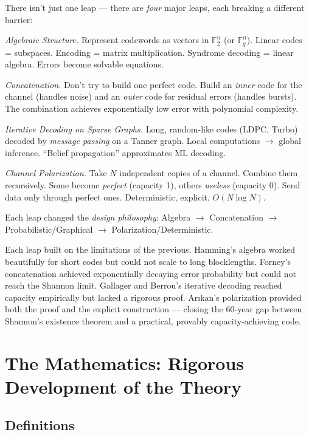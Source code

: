 There isn't just one leap — there are \emph{four} major leaps, each breaking a different barrier:

\emph{Algebraic Structure.} Represent codewords as vectors in $\mathbb{F}_2^n$ (or $\mathbb{F}_q^n$). Linear codes = subspaces. Encoding = matrix multiplication. Syndrome decoding = linear algebra. Errors become solvable equations.

\emph{Concatenation.} Don't try to build one perfect code. Build an \emph{inner} code for the channel (handles noise) and an \emph{outer} code for residual errors (handles bursts). The combination achieves exponentially low error with polynomial complexity.

\emph{Iterative Decoding on Sparse Graphs.} Long, random-like codes (LDPC, Turbo) decoded by \emph{message passing} on a Tanner graph. Local computations $\to$ global inference. ``Belief propagation'' approximates ML decoding.

\emph{Channel Polarization.} Take $N$ independent copies of a channel. Combine them recursively. Some become \emph{perfect} (capacity 1), others \emph{useless} (capacity 0). Send data only through perfect ones. Deterministic, explicit, $O(N \log N)$.

Each leap changed the \emph{design philosophy}: Algebra $\to$ Concatenation $\to$ Probabilistic/Graphical $\to$ Polarization/Deterministic.

Each leap built on the limitations of the previous. Hamming's algebra worked beautifully for short codes but could not scale to long blocklengths. Forney's concatenation achieved exponentially decaying error probability but could not reach the Shannon limit. Gallager and Berrou's iterative decoding reached capacity empirically but lacked a rigorous proof. Arıkan's polarization provided both the proof and the explicit construction — closing the 60-year gap between Shannon's existence theorem and a practical, provably capacity-achieving code.

\section{The Mathematics: Rigorous Development of the Theory}
\label{sec:ec:math}

\subsection{Definitions}
\label{sec:ec:definitions}

